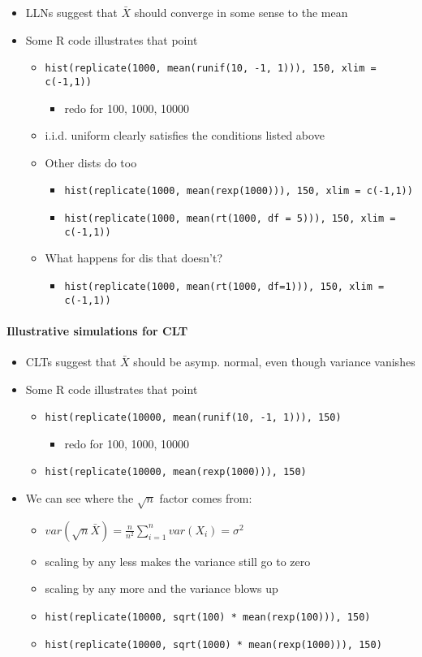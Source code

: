 \begin{itemize}
\item LLNs suggest that $\bar X$ should converge in some sense to the mean
\item Some R code illustrates that point
\begin{itemize}
\item \texttt{hist(replicate(1000, mean(runif(10, -1, 1))), 150, xlim = c(-1,1))}
\begin{itemize}
\item redo for 100, 1000, 10000
\end{itemize}
\item i.i.d. uniform clearly satisfies the conditions listed above
\item Other dists do too
\begin{itemize}
\item \texttt{hist(replicate(1000, mean(rexp(1000))), 150, xlim = c(-1,1))}
\item \texttt{hist(replicate(1000, mean(rt(1000, df = 5))), 150, xlim = c(-1,1))}
\end{itemize}
\item What happens for dis that doesn't?
\begin{itemize}
\item \texttt{hist(replicate(1000, mean(rt(1000, df=1))), 150, xlim = c(-1,1))}
\end{itemize}
\end{itemize}
\end{itemize}
\paragraph{Illustrative simulations for CLT}
\label{sec-1-1-3}

\begin{itemize}
\item CLTs suggest that $\bar X$ should be asymp. normal, even though variance vanishes
\item Some R code illustrates that point
\begin{itemize}
\item \texttt{hist(replicate(10000, mean(runif(10, -1, 1))), 150)}
\begin{itemize}
\item redo for 100, 1000, 10000
\end{itemize}
\item \texttt{hist(replicate(10000, mean(rexp(1000))), 150)}
\end{itemize}
\item We can see where the $\sqrt{n}$ factor comes from:
\begin{itemize}
\item $var(\sqrt{n} \bar X) = \frac{n}{n^2} \sum_{i=1}^n var(X_i) = \sigma^2$
\item scaling by any less makes the variance still go to zero
\item scaling by any more and the variance blows up
\item \texttt{hist(replicate(10000, sqrt(100) * mean(rexp(100))), 150)}
\item \texttt{hist(replicate(10000, sqrt(1000) * mean(rexp(1000))), 150)}
\end{itemize}
\end{itemize}
